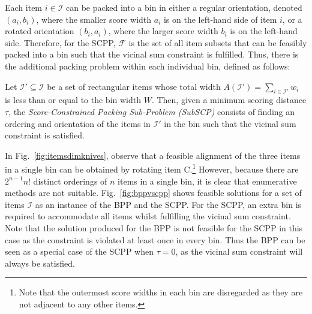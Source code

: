 \documentclass{IEEEtran}
\begin{document}
Each item $i \in \mathcal{I}$ can be packed into a bin in either a regular orientation, denoted $(a_i, b_i)$, where the smaller score width $a_i$ is on the left-hand side of item $i$, or a rotated orientation $(b_i, a_i)$, where the larger score width $b_i$ is on the left-hand side. Therefore, for the SCPP, $\mathcal{F}$ is the set of all item subsets that can be feasibly packed into a bin such that the vicinal sum constraint is fulfilled. Thus, there is the additional packing problem within each individual bin, defined as follows:

\begin{definition}
	Let $\mathcal{I}' \subseteq \mathcal{I}$ be a set of rectangular items whose total width $A(\mathcal{I}') = \sum_{i \in \mathcal{I}'} w_i$ is less than or equal to the bin width $W$. Then, given a minimum scoring distance $\tau$, the \emph{Score-Constrained Packing Sub-Problem (SubSCP)} consists of finding an ordering and orientation of the items in $\mathcal{I}'$ in the bin such that the vicinal sum constraint is satisfied.
	\label{defn:subscp}
\end{definition}

In Fig.~\ref{fig:itemsdimknives}, observe that a feasible alignment of the three items in a single bin can be obtained by rotating item C.\footnote{Note that the outermost score widths in each bin are disregarded as they are not adjacent to any other items.} However, because there are $2^{n-1} n!$ distinct orderings of $n$ items in a single bin, it is clear that enumerative methods are not suitable. Fig.~\ref{fig:bppvscpp} shows feasible solutions for a set of items $\mathcal{I}$ as an instance of the BPP and the SCPP. For the SCPP, an extra bin is required to accommodate all items whilst fulfilling the vicinal sum constraint. Note that the solution produced for the BPP is not feasible for the SCPP in this case as the constraint is violated at least once in every bin. Thus the BPP can be seen as a special case of the SCPP when $\tau=0$, as the vicinal sum constraint will always be satisfied.
\end{document}

